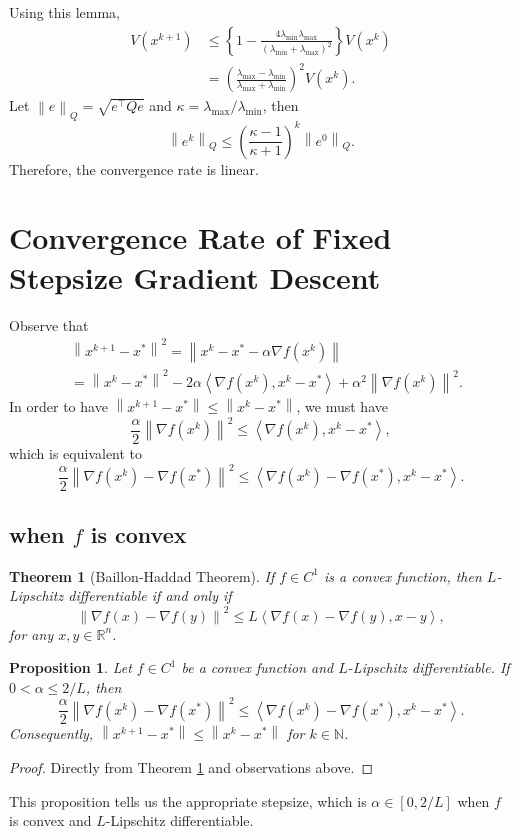 \documentclass[12pt,a4paper]{report}
\numberwithin{equation}{section}
\theoremstyle{mystyle}
\newtheorem{theorem}[definition]{Theorem}
\newtheorem{proposition}[definition]{Proposition}
\newcommand{\R}{\mathbb{R}}
\newcommand{\N}{\mathbb{N}}
\newcommand{\grad}{\nabla}
\newcommand{\T}{\top}
\newcommand{\norm}[1]{\left\lVert #1 \right\rVert}
\newcommand{\inner}[1]{\left\langle #1 \right\rangle}
\begin{document}
	Using this lemma, 
	\begin{align*}
		V(x^{k+1})&\leq \left\{1-\frac{4\lambda_{\min}\lambda_{\max}}{(\lambda_{\min}+\lambda_{\max})^2}\right\} V(x^k)\\
		&=\left(\frac{\lambda_{\max}-\lambda_{\min}}{\lambda_{\max}+\lambda_{\min}}\right)^2 V(x^k).
	\end{align*}
	Let $\norm{e}_Q=\sqrt{e^\T Q e}$ and $\kappa=\lambda_{\max}/\lambda_{\min}$, then
	\begin{equation}
		\norm{e^k}_Q\leq \left(\frac{\kappa-1}{\kappa+1}\right)^k \norm{e^0}_Q.
	\end{equation}
	Therefore, the convergence rate is linear.
	
	
	\section{Convergence Rate of Fixed Stepsize Gradient Descent}
	Observe that 
	\begin{align*}
		&\norm{x^{k+1}-x^*}^2=\norm{x^{k}-x^*-\alpha \grad f(x^k)}\\
		&=\norm{x^{k}-x^*}^2-2\alpha\inner{\grad f(x^k), x^k-x^*}+\alpha^2\norm{\grad f(x^k)}^2.
	\end{align*}
	In order to have $\norm{x^{k+1}-x^*}\leq \norm{x^{k}-x^*}$, we must have
	$$
	\frac{\alpha}{2}\norm{\grad f(x^k)}^2\leq \inner{\grad f(x^k), x^k-x^*},
	$$
	which is equivalent to
	\begin{equation}
		\frac{\alpha}{2}\norm{\grad f(x^k)-\grad f(x^*)}^2\leq \inner{\grad f(x^k)-\grad f(x^*), x^k-x^*}.
	\end{equation}

	\subsection{when $f$ is convex}
	\begin{theorem}[Baillon-Haddad Theorem]\label{thm:Baillon-Haddad}
		If $f\in C^1$ is a convex function, then $L$-Lipschitz differentiable if and only if
		$$
		\norm{\grad f(x)-\grad f(y)}^2\leq L\inner{\grad f(x)-\grad f(y),x-y},
		$$
		for any $x,y\in \R^n$.
	\end{theorem}

	\begin{proposition}
		Let $f\in C^1$ be a convex function and $L$-Lipschitz differentiable. If $0<\alpha\leq 2/L$, then
		$$
		\frac{\alpha}{2}\norm{\grad f(x^k)-\grad f(x^*)}^2\leq \inner{\grad f(x^k)-\grad f(x^*), x^k-x^*}.
		$$
		Consequently, $\norm{x^{k+1}-x^*}\leq \norm{x^k-x^*}$ for $k\in\N$.
	\end{proposition}
	\begin{proof}
		Directly from Theorem \ref{thm:Baillon-Haddad} and observations above. 
	\end{proof}
	This proposition tells us the appropriate stepsize, which is $\alpha\in [0,2/L]$ when $f$ is convex and $L$-Lipschitz differentiable.
	
\end{document}
